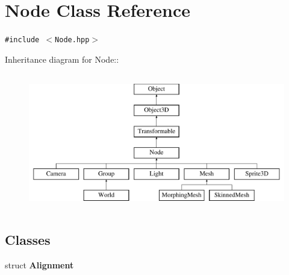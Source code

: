 \hypertarget{classm3g_1_1Node}{
\section{Node Class Reference}
\label{classm3g_1_1Node}
}
{\tt \#include $<$Node.hpp$>$}

Inheritance diagram for Node::\begin{figure}[H]
\begin{center}
\leavevmode
\includegraphics[height=6cm]{classm3g_1_1Node}
\end{center}
\end{figure}
\subsection*{Classes}
\begin{CompactItemize}
\item 
struct \textbf{Alignment}
\end{CompactItemize}
